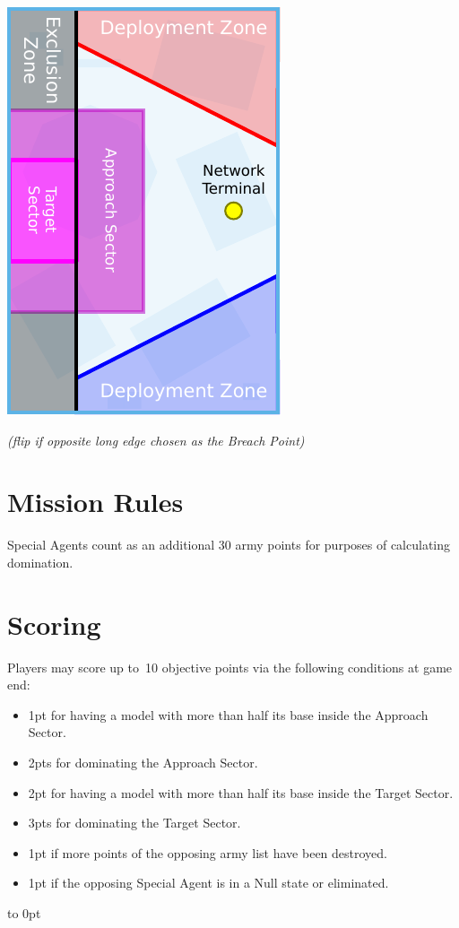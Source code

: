 \begin{minipage}[t]{2in}\centering
\vspace{4pt}   
\includegraphics{maps/map-breachpoint}

\medskip\small%
\emph{(flip if opposite long edge chosen as the Breach Point)}
\end{minipage}

\section{Mission Rules}

Special Agents count as an additional 30 army points for purposes of
calculating domination.

\section{Scoring}

Players may score up to~10 objective points via the following
conditions at game end:
\begin{itemize}\shortlist
\item 1pt for having a model with more than half its base inside the
  Approach Sector.
\item 2pts for dominating the Approach Sector.
\item 2pt for having a model with more than half its base inside the
  Target Sector.
\item 3pts for dominating the Target Sector.
\item 1pt if more points of the opposing army list have been destroyed.
\item 1pt if the opposing Special Agent is in a Null state or eliminated.
\end{itemize}

\vfill
\vbox to 0pt{}